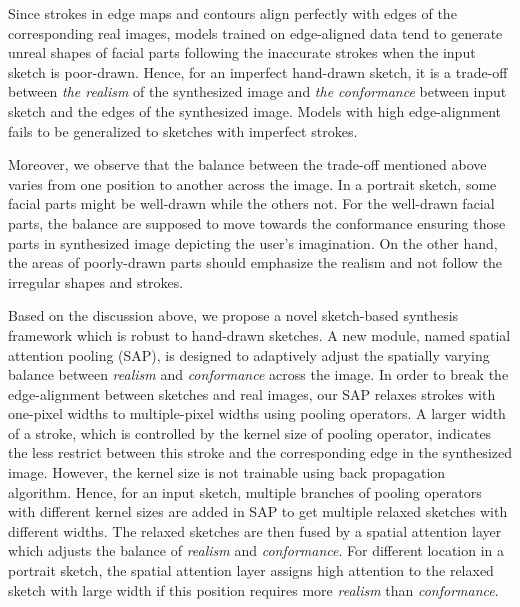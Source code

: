 Since strokes in edge maps and contours align perfectly with edges of the corresponding real images, models trained on edge-aligned data tend to generate unreal shapes of facial parts following the inaccurate strokes when the input sketch is poor-drawn. Hence, for an imperfect hand-drawn sketch, it is a trade-off between \textit{the realism} of the synthesized image and \textit{the conformance} between input sketch and the edges of the synthesized image.
Models with high edge-alignment fails to be generalized to sketches with imperfect strokes.

Moreover, we observe that the balance between the trade-off mentioned above varies from one position to another across the image. In a portrait sketch, some facial parts might be well-drawn while the others not. For the well-drawn facial parts, the balance are supposed to move towards the conformance ensuring those parts in synthesized image depicting the user's imagination. On the other hand, the areas of poorly-drawn parts should emphasize the realism and not follow the irregular shapes and strokes.

Based on the discussion above, we propose a novel sketch-based synthesis framework which is robust to hand-drawn sketches. A new module, named spatial attention pooling (SAP), is designed to adaptively adjust the spatially varying balance between \textit{realism} and \textit{conformance} across the image. In order to break the edge-alignment between sketches and real images, our SAP relaxes strokes with one-pixel widths to multiple-pixel widths using pooling operators. A larger width of a stroke, which is controlled by the kernel size of pooling operator, indicates the less restrict between this stroke and the corresponding edge in the synthesized image. However, the kernel size is not trainable using back propagation algorithm. Hence, for an input sketch, multiple branches of pooling operators with different kernel sizes are added in SAP to get multiple relaxed sketches with different widths. The relaxed sketches are then fused by a spatial attention layer which adjusts the balance of \textit{realism} and \textit{conformance}. For different location in a portrait sketch, the spatial attention layer assigns high attention to the relaxed sketch with large width if this position requires more \textit{realism} than \textit{conformance}. 

